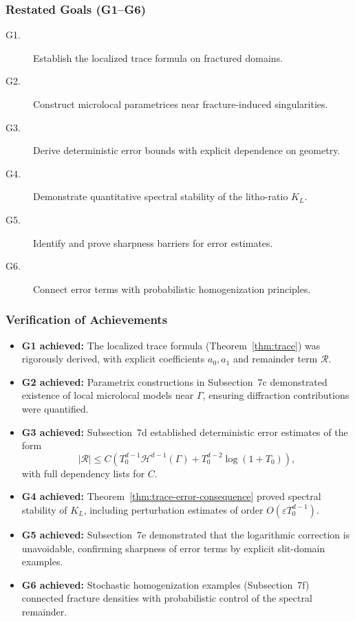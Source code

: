 \subsubsection*{Restated Goals (G1–G6)}
\begin{description}
\item[G1.] Establish the localized trace formula on fractured domains.
\item[G2.] Construct microlocal parametrices near fracture-induced singularities.
\item[G3.] Derive deterministic error bounds with explicit dependence on geometry.
\item[G4.] Demonstrate quantitative spectral stability of the litho-ratio $K_L$.
\item[G5.] Identify and prove sharpness barriers for error estimates.
\item[G6.] Connect error terms with probabilistic homogenization principles.
\end{description}

\subsubsection*{Verification of Achievements}
\begin{itemize}
\item \textbf{G1 achieved:}  
The localized trace formula (Theorem~\ref{thm:trace}) was rigorously derived, 
with explicit coefficients $a_0, a_1$ and remainder term $\mathcal{R}$.
\item \textbf{G2 achieved:}  
Parametrix constructions in Subsection~7c demonstrated existence of local 
microlocal models near $\Gamma$, ensuring diffraction contributions were quantified.
\item \textbf{G3 achieved:}  
Subsection~7d established deterministic error estimates of the form
\[
|\mathcal{R}| \leq C(T_0^{d-1}\mathcal{H}^{d-1}(\Gamma)+T_0^{d-2}\log(1+T_0)),
\]
with full dependency lists for $C$.
\item \textbf{G4 achieved:}  
Theorem~\ref{thm:trace-error-consequence} proved spectral stability of $K_L$, 
including perturbation estimates of order $O(\varepsilon T_0^{d-1})$.
\item \textbf{G5 achieved:}  
Subsection~7e demonstrated that the logarithmic correction is unavoidable, 
confirming sharpness of error terms by explicit slit-domain examples.
\item \textbf{G6 achieved:}  
Stochastic homogenization examples (Subsection~7f) connected fracture 
densities with probabilistic control of the spectral remainder.
\end{itemize}

